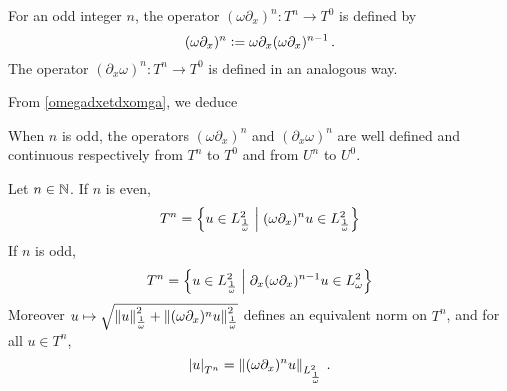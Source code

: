 \documentclass[a4paper]{article}
\begin{document}
\begin{Def}
	For an odd integer $n$, the operator $(\omega \partial_x)^n : T^n \to T^{0}$ is defined by
	\[(\omega \partial_x)^n \mathrel{\mathop:}= \omega \partial_x (\omega \partial_x)^{n-1}\,.\] 
	The operator $( \partial_x \omega)^n : T^n \to T^{0}$ is defined in an analogous way. 
\end{Def}
\noindent From \autoref{omegadxetdxomga}, we deduce 
\begin{Cor}
	\label{Lemnimpair}
	When $n$ is odd, the operators $(\omega \partial_x)^n$ and $(\partial_x \omega)^n$ are well defined and continuous respectively from $T^n$ to $T^0$ and from $U^n$ to $U^0$. 
\end{Cor}
\begin{Lem}
	Let $n \in \mathbb{N}$. If $n$ is even,
	\[T^n = \left\{ u \in L^2_\frac{1}{\omega}\mathrel{}\middle|\mathrel{}(\omega \partial_x)^n u \in L^2_\frac{1}{\omega}\right\}\]
	If $n$ is odd, 
	\[T^n = \left\{u \in L^2_\frac{1}{\omega}\mathrel{}\middle|\mathrel{}\partial_x(\omega \partial_x)^{n-1} u \in L^2_\omega\right\}\] 
	Moreover $u \mapsto \sqrt{\left\|u\right\|_\frac{1}{\omega}^2 + \left\|(\omega \partial_x)^nu\right\|^2_{\frac{1}{\omega}}}$ defines an equivalent norm on $T^n$, and for all $u \in T^n$, 
	\[\left\lvert u \right\rvert_{T^n} = \left\|(\omega \partial_x)^n u\right\|_{L^2_\frac{1}{\omega}}\,.\]
	\label{LemEquivalentNormsTn}
\end{Lem}
\end{document}
